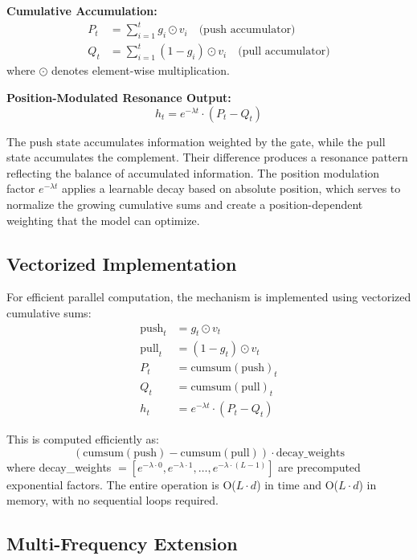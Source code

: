 \documentclass{article}
\begin{document}
\textbf{Cumulative Accumulation:}
\begin{align}
P_t &= \sum_{i=1}^{t} g_i \odot v_i \quad \text{(push accumulator)} \\
Q_t &= \sum_{i=1}^{t} (1-g_i) \odot v_i \quad \text{(pull accumulator)}
\end{align}
where $\odot$ denotes element-wise multiplication.

\textbf{Position-Modulated Resonance Output:}
\begin{equation}
h_t = e^{-\lambda t} \cdot (P_t - Q_t)
\end{equation}

The push state accumulates information weighted by the gate, while the pull state accumulates the complement. Their difference produces a resonance pattern reflecting the balance of accumulated information. The position modulation factor $e^{-\lambda t}$ applies a learnable decay based on absolute position, which serves to normalize the growing cumulative sums and create a position-dependent weighting that the model can optimize.

\subsection{Vectorized Implementation}

For efficient parallel computation, the mechanism is implemented using vectorized cumulative sums:
\begin{align}
\text{push}_t &= g_t \odot v_t \\
\text{pull}_t &= (1 - g_t) \odot v_t \\
P_t &= \text{cumsum}(\text{push})_t \\
Q_t &= \text{cumsum}(\text{pull})_t \\
h_t &= e^{-\lambda t} \cdot (P_t - Q_t)
\end{align}

This is computed efficiently as:
\begin{equation}
(\text{cumsum}(\text{push}) - \text{cumsum}(\text{pull})) \cdot \text{decay\_weights}
\end{equation}
where decay\_weights $= [e^{-\lambda \cdot 0}, e^{-\lambda \cdot 1}, \ldots, e^{-\lambda \cdot (L-1)}]$ are precomputed exponential factors. The entire operation is O($L \cdot d$) in time and O($L \cdot d$) in memory, with no sequential loops required.

\subsection{Multi-Frequency Extension}
\end{document}
